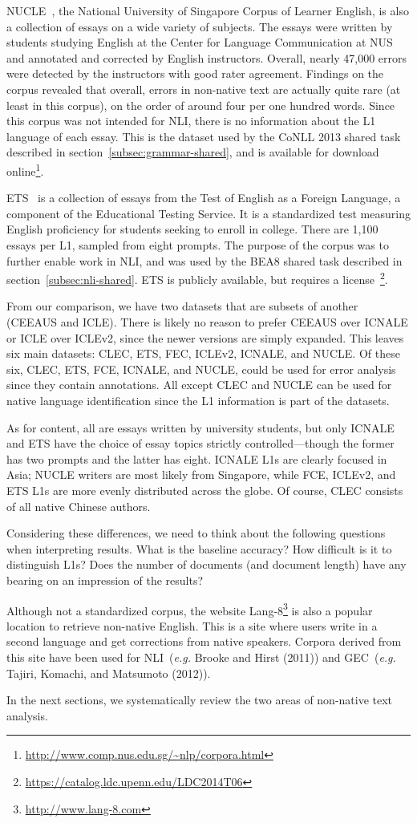 NUCLE~\cite{nucle}, the National University of Singapore Corpus of Learner
English, is also a collection of essays on a wide variety of subjects. The
essays were written by students studying English at the Center for Language
Communication at NUS and annotated and corrected by English instructors.
Overall, nearly 47,000 errors were detected by the instructors with good rater
agreement. Findings on the corpus revealed that overall, errors in non-native
text are actually quite rare (at least in this corpus), on the order of around
four per one hundred words. Since this corpus was not intended for NLI, there is
no information about the L1 language of each essay. This is the dataset used by
the CoNLL 2013 shared task described in section~\ref{subsec:grammar-shared}, and
is available for download
online\footnote{\url{http://www.comp.nus.edu.sg/~nlp/corpora.html}}.

ETS~\cite{toef11} is a collection of essays from the Test of English as a
Foreign Language, a component of the Educational Testing Service. It is a
standardized test measuring English proficiency for students seeking to enroll
in college. There are 1,100 essays per L1, sampled from eight prompts. The
purpose of the corpus was to further enable work in NLI\@, and was used by the
BEA8 shared task described in section~\ref{subsec:nli-shared}. ETS is publicly
available, but requires a
license~\footnote{\url{https://catalog.ldc.upenn.edu/LDC2014T06}}.

From our comparison, we have two datasets that are subsets of another (CEEAUS
and ICLE). There is likely no reason to prefer CEEAUS over ICNALE or ICLE over
ICLEv2, since the newer versions are simply expanded. This leaves six main
datasets: CLEC, ETS, FEC, ICLEv2, ICNALE, and NUCLE\@. Of these six, CLEC, ETS,
FCE, ICNALE, and NUCLE, could be used for error analysis since they contain
annotations. All except CLEC and NUCLE can be used for native language
identification since the L1 information is part of the datasets.

As for content, all are essays written by university students, but only ICNALE
and ETS have the choice of essay topics strictly controlled---though the former
has two prompts and the latter has eight. ICNALE L1s are clearly focused in
Asia; NUCLE writers are most likely from Singapore, while FCE, ICLEv2, and ETS
L1s are more evenly distributed across the globe. Of course, CLEC consists of
all native Chinese authors.

Considering these differences, we need to think about the following questions
when interpreting results. What is the baseline accuracy? How difficult is it to
distinguish L1s? Does the number of documents (and document length) have any
bearing on an impression of the results?

Although not a standardized corpus, the website
Lang-8\footnote{\url{http://www.lang-8.com}} is also a popular location to
retrieve non-native English. This is a site where users write in a second
language and get corrections from native speakers. Corpora derived from this
site have been used for NLI~(\emph{e.g.} Brooke and Hirst (2011)) and
GEC~(\emph{e.g.} Tajiri, Komachi, and Matsumoto (2012)).

In the next sections, we systematically review the two areas of non-native text
analysis.
